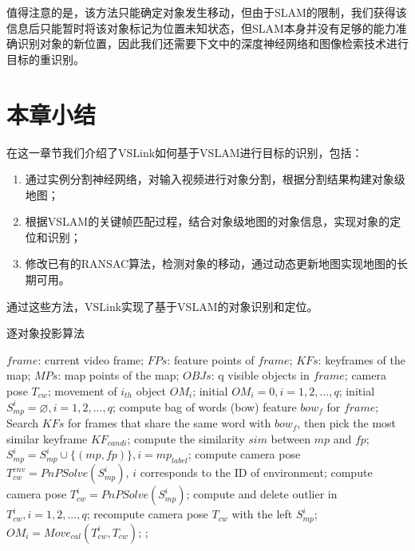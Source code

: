 值得注意的是，该方法只能确定对象发生移动，但由于SLAM的限制，我们获得该信息后只能暂时将该对象标记为位置未知状态，但SLAM本身并没有足够的能力准确识别对象的新位置，因此我们还需要下文中的深度神经网络和图像检索技术进行目标的重识别。

\section{本章小结}
在这一章节我们介绍了VSLink如何基于VSLAM进行目标的识别，包括：
\begin{enumerate}
	\item 通过实例分割神经网络，对输入视频进行对象分割，根据分割结果构建对象级地图；
	\item 根据VSLAM的关键帧匹配过程，结合对象级地图的对象信息，实现对象的定位和识别；
	\item 修改已有的RANSAC算法，检测对象的移动，通过动态更新地图实现地图的长期可用。
\end{enumerate}
通过这些方法，VSLink实现了基于VSLAM的对象识别和定位。

\begin{algorithm}[htb]  
	\caption{逐对象投影算法}  
	\label{alg::poa}  
	\begin{algorithmic}[1]  
		\Require  
		$frame$: current video frame;
		$FPs$: feature points of $frame$;  
		$KFs$: keyframes of the map;  
		$MPs$: map points of the map;
		$OBJs$: q visible objects in $frame$;   
		\Ensure  
		camera pose $T_{cw}$;
		movement of $i_{th}$ object $OM_i$;
		\State initial $OM_i=0, i = 1,2,...,q$;
		\State initial $S_{mp}^i=\varnothing, i=1,2,...,q$;
		\State compute bag of words (bow) feature $bow_f$ for $frame$;
		\State Search $KFs$ for frames that share the same word with $bow_f$, then pick the most similar keyframe $KF_{candi}$;
		compute the similarity $sim$ between $mp$ and $fp$;
		\State $S_{mp}^i = S_{mp}^i\cup\{(mp,fp)\}, i = mp_{label}$;
		\EndIf
		\EndFor 
		\EndFor
		\State compute camera pose $T_{cw}^{env} = PnPSolve(S_{mp}^i)$, $i$ corresponds to the ID of environment;
		\State compute camera pose $T_{cw}^{i} = PnPSolve(S_{mp}^i)$;
		\EndFor
		\EndFor
		\State compute and delete outlier in ${T_{cw}^{i}, i=1,2,...,q}$;
		\State recompute camera pose $T_{cw}$ with the left $S_{mp}^i$;
		\State $OM_i = Move_{cal}(T_{cw}^{i}, T_{cw})$; 
		\Else 
		;
		\EndIf
	\end{algorithmic}
\end{algorithm}  



